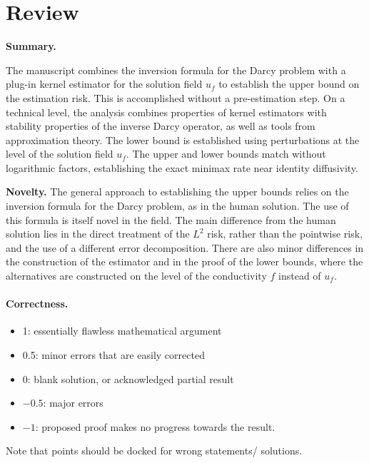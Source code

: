 \documentclass[11pt]{article}
\numberwithin{equation}{section}
\begin{document}
\maketitle

\section{Review}

\textbf{Summary.}

The manuscript combines the inversion formula for the Darcy problem with a plug-in kernel estimator for the solution field $u_f$ to establish the upper bound on the estimation risk. This is accomplished without a pre-estimation step. On a technical level, the analysis combines properties of kernel estimators with stability properties of the inverse Darcy operator, as well as tools from approximation theory. The lower bound is established using perturbations at the level of the solution field $u_f$. The upper and lower bounds match without logarithmic factors, establishing the exact minimax rate near identity diffusivity.


\textbf{Novelty.} 
The general approach to establishing the upper bounds relies on the inversion formula for the Darcy problem, as in the human solution. The use of this formula is itself novel in the field. The main difference from the human solution lies in the direct treatment of the $L^2$ risk, rather than the pointwise risk, and the use of a different error decomposition. There are also minor differences in the construction of the estimator and in the proof of the lower bounds, where the alternatives are constructed on the level of the conductivity $f$ instead of $u_f$.

\paragraph{Correctness.}
\begin{itemize}
	\item  1: essentially flawless mathematical argument
	\item  0.5: minor errors that are easily corrected
	\item  0: blank solution, or acknowledged partial result
	\item  $-0.5$: major errors
	\item  $-1$: proposed proof makes no progress towards the result.
\end{itemize}
Note that points should be docked for wrong statements/ solutions.
\end{document}

